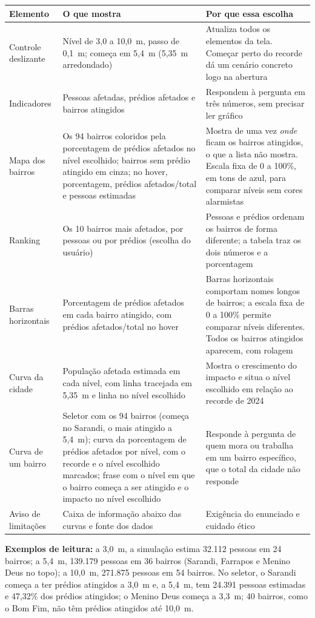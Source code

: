 \documentclass[11pt,a4paper]{article}
\begin{document}
\begin{longtable}{L{3.2cm} L{6.2cm} L{6.2cm}}
\toprule
Elemento & O que mostra & Por que essa escolha\\
\midrule
\endhead
Controle deslizante & Nível de 3,0 a 10,0~m, passo de 0,1~m; começa em 5,4~m (5,35~m arredondado) & Atualiza todos os elementos da tela. Começar perto do recorde dá um cenário concreto logo na abertura\\
Indicadores & Pessoas afetadas, prédios afetados e bairros atingidos & Respondem à pergunta em três números, sem precisar ler gráfico\\
Mapa dos bairros & Os 94 bairros coloridos pela porcentagem de prédios afetados no nível escolhido; bairros sem prédio atingido em cinza; no hover, porcentagem, prédios afetados/total e pessoas estimadas & Mostra de uma vez \emph{onde} ficam os bairros atingidos, o que a lista não mostra. Escala fixa de 0 a 100\%, em tons de azul, para comparar níveis sem cores alarmistas\\
Ranking & Os 10 bairros mais afetados, por pessoas ou por prédios (escolha do usuário) & Pessoas e prédios ordenam os bairros de forma diferente; a tabela traz os dois números e a porcentagem\\
Barras horizontais & Porcentagem de prédios afetados em cada bairro atingido, com prédios afetados/total no hover & Barras horizontais comportam nomes longos de bairros; a escala fixa de 0 a 100\% permite comparar níveis diferentes. Todos os bairros atingidos aparecem, com rolagem\\
Curva da cidade & População afetada estimada em cada nível, com linha tracejada em 5,35~m e linha no nível escolhido & Mostra o crescimento do impacto e situa o nível escolhido em relação ao recorde de 2024\\
Curva de um bairro & Seletor com os 94 bairros (começa no Sarandi, o mais atingido a 5,4~m); curva da porcentagem de prédios afetados por nível, com o recorde e o nível escolhido marcados; frase com o nível em que o bairro começa a ser atingido e o impacto no nível escolhido & Responde à pergunta de quem mora ou trabalha em um bairro específico, que o total da cidade não responde\\
Aviso de limitações & Caixa de informação abaixo das curvas e fonte dos dados & Exigência do enunciado e cuidado ético\\
\bottomrule
\end{longtable}

\textbf{Exemplos de leitura:} a 3,0~m, a simulação estima 32.112 pessoas em 24 bairros; a 5,4~m, 139.179 pessoas em 36 bairros (Sarandi, Farrapos e Menino Deus no topo); a 10,0~m, 271.875 pessoas em 54 bairros. No seletor, o Sarandi começa a ter prédios atingidos a 3,0~m e, a 5,4~m, tem 24.391 pessoas estimadas e 47,32\% dos prédios atingidos; o Menino Deus começa a 3,3~m; 40 bairros, como o Bom Fim, não têm prédios atingidos até 10,0~m.
\end{document}
